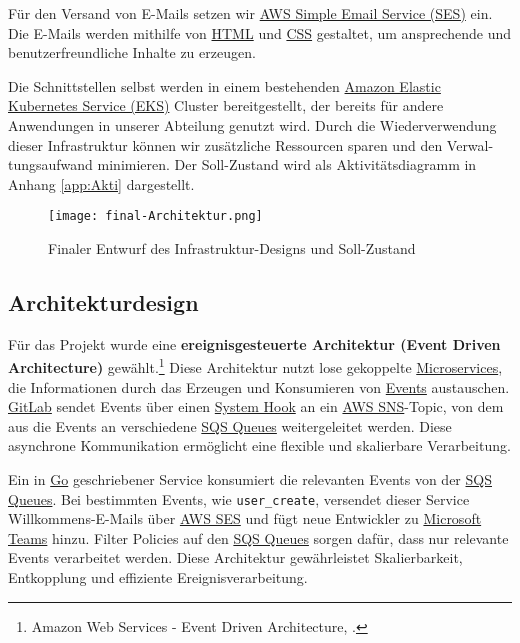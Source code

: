 Für den Versand von E-Mails setzen wir \hyperlink{SES}{\textcolor{AOBlau}{AWS Simple Email Service (SES)}} ein. Die E-Mails werden mithilfe von \hyperlink{HTML}{\textcolor{AOBlau}{HTML}} und \hyperlink{CSS}{\textcolor{AOBlau}{CSS}} gestaltet, um ansprechende und benutzerfreundliche Inhalte zu erzeugen.

Die Schnittstellen selbst werden in einem bestehenden \hyperlink{EKS}{\textcolor{AOBlau}{Amazon Elastic Kubernetes Service (EKS)}} Cluster bereitgestellt, der bereits für andere Anwendungen in unserer Abteilung genutzt wird. Durch die Wiederverwendung dieser Infrastruktur können wir zusätzliche Ressourcen sparen und den Verwal-
tungsaufwand minimieren. Der Soll-Zustand wird als Aktivitätsdiagramm in Anhang \ref{app:Akti} dargestellt.


\begin{figure}[h]
	\centering
	\texttt{[image: final-Architektur.png]}
	\caption{Finaler Entwurf des Infrastruktur-Designs und Soll-Zustand}
\end{figure}

\subsection{Architekturdesign}
\label{sec:Architekturdesign}

Für das Projekt wurde eine \textbf{ereignisgesteuerte Architektur (Event Driven Architecture)} gewählt.\footnote{Amazon Web Services - Event Driven Architecture, \cite{awsEDA}.} Diese Architektur nutzt lose gekoppelte \hyperlink{Microservices}{\textcolor{AOBlau}{Microservices}}, die Informationen durch das Erzeugen und Konsumieren von \hyperlink{GitLabEvent}{\textcolor{AOBlau}{Events}} austauschen. \hyperlink{GitLab}{\textcolor{AOBlau}{GitLab}} sendet Events über einen \hyperlink{GitLabSystemhooks}{\textcolor{AOBlau}{System Hook}} an ein \hyperlink{SNS}{\textcolor{AOBlau}{AWS SNS}}-Topic, von dem aus die Events an verschiedene \hyperlink{SQS}{\textcolor{AOBlau}{SQS Queues}} weitergeleitet werden. Diese asynchrone Kommunikation ermöglicht eine flexible und skalierbare Verarbeitung.

Ein in \hyperlink{Go}{\textcolor{AOBlau}{Go}} geschriebener Service konsumiert die relevanten Events von der \hyperlink{SQS}{\textcolor{AOBlau}{SQS Queues}}. Bei bestimmten Events, wie \texttt{user\_create}, versendet dieser Service Willkommens-E-Mails über \hyperlink{SES}{\textcolor{AOBlau}{AWS SES}} und fügt neue Entwickler zu \hyperlink{MicrosoftTeams}{\textcolor{AOBlau}{Microsoft Teams}} hinzu. Filter Policies auf den \hyperlink{SQS}{\textcolor{AOBlau}{SQS Queues}} sorgen dafür, dass nur relevante Events verarbeitet werden. Diese Architektur gewährleistet Skalierbarkeit, Entkopplung und effiziente Ereignisverarbeitung.

